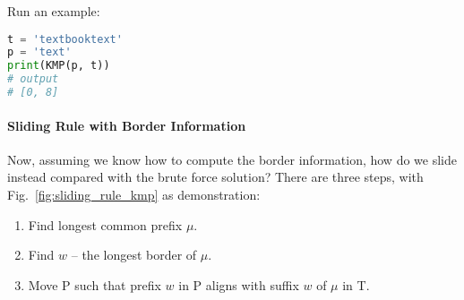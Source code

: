 \documentclass[../main.tex]{subfiles}
\begin{document}
Run an example:
\begin{lstlisting}[language=Python]
t = 'textbooktext'
p = 'text'
print(KMP(p, t))
# output
# [0, 8]
\end{lstlisting}

\paragraph{Sliding Rule with Border Information} Now, assuming we know how to compute the border information, how do we slide instead compared with the brute force solution? There are three steps, with Fig.~\ref{fig:sliding_rule_kmp} as demonstration:

\begin{enumerate}
    \item Find longest common prefix $\mu$.
    \item Find $w$ -- the longest border of $\mu$. 
    \item Move P such that prefix $w$ in P aligns with suffix $w$ of $\mu$ in T. 
\end{enumerate}


    
    
\end{document}
